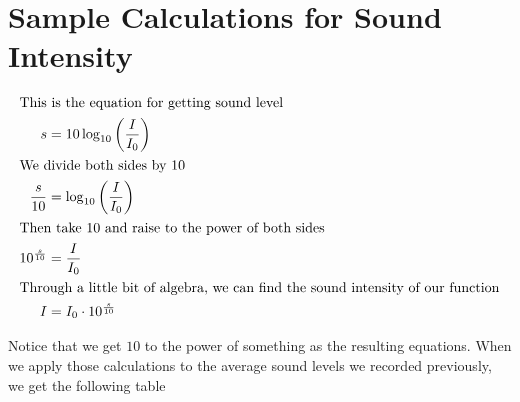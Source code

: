 \documentclass[index]{subfiles}
\begin{document}
\section{Sample Calculations for Sound Intensity}

\begin{align*}
    \intertext{This is the equation for getting sound level}
    s                 & =10\log_{10}\left(\frac{I}{I_{0}}\right) \\
    \intertext{We divide both sides by 10}
    \frac{s}{10}      & =\log_{10}\left(\frac{I}{I_{0}}\right)   \\
    \intertext{Then take 10 and raise to the power of both sides}
    10^{\frac{s}{10}} & =\frac{I}{I_{0}}                         \\
    \intertext{Through a little bit of algebra, we can find the sound intensity of our function}
    I                 & =I_{0}\cdot10^{\frac{s}{10}}
\end{align*}

Notice that we get \(10\) to the power of something as the resulting equations. When we apply those calculations to the average sound levels we recorded previously, we get the following table
\end{document}
